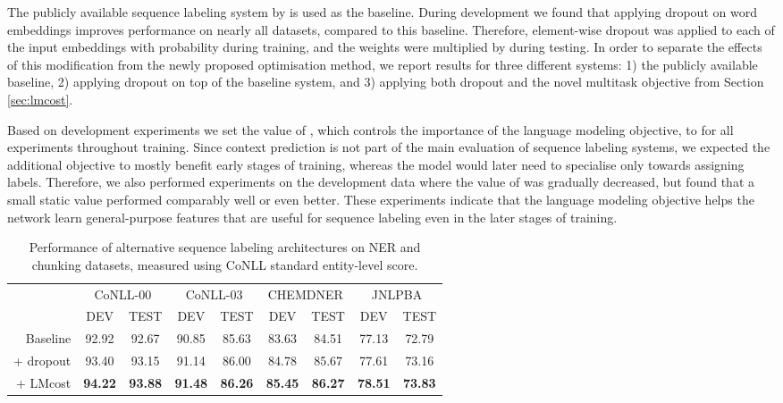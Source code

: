 \documentclass[11pt,a4paper]{article}
\begin{document}
The publicly available sequence labeling system by  is used as the baseline.
During development we found that applying dropout \cite{Srivastava2014a} on word embeddings improves performance on nearly all datasets, compared to this baseline. Therefore, element-wise dropout was applied to each of the input embeddings with probability  during training, and the weights were multiplied by  during testing. In order to separate the effects of this modification from the newly proposed optimisation method, we report results for three different systems: 1) the publicly available baseline, 2) applying dropout on top of the baseline system, and 3) applying both dropout and the novel multitask objective from Section \ref{sec:lmcost}.

Based on development experiments we set the value of , which controls the importance of the language modeling objective, to  for all experiments throughout training.
Since context prediction is not part of the main evaluation of sequence labeling systems, we expected the additional objective to mostly benefit early stages of training, whereas the model would later need to specialise only towards assigning labels. Therefore, we also performed experiments on the development data where the value of  was gradually decreased, but found that a small static value performed comparably well or even better. These experiments indicate that the language modeling objective helps the network learn general-purpose features that are useful for sequence labeling even in the later stages of training.





\begin{table*}[t]
\setlength\tabcolsep{11.7pt}
\begin{tabular}{r|cc|cc|cc|cc} \toprule
 & \multicolumn{2}{c|}{CoNLL-00} & \multicolumn{2}{c|}{CoNLL-03} & \multicolumn{2}{c|}{CHEMDNER} & \multicolumn{2}{c}{JNLPBA} \\ 
 & {\small DEV} & {\small TEST} & {\small DEV} & {\small TEST} & {\small DEV} & {\small TEST} & {\small DEV} & {\small TEST} \\\midrule
Baseline & 92.92 & 92.67 & 90.85 & 85.63 & 83.63 & 84.51 & 77.13 & 72.79 \\
+ dropout & 93.40 & 93.15 & 91.14 & 86.00 & 84.78 & 85.67 & 77.61 & 73.16 \\
+ LMcost & \textbf{94.22} & \textbf{93.88} & \textbf{91.48} & \textbf{86.26} & \textbf{85.45} & \textbf{86.27} & \textbf{78.51} & \textbf{73.83} \\ \bottomrule
\end{tabular}
\caption{Performance of alternative sequence labeling architectures on NER and chunking datasets, measured using CoNLL standard entity-level  score.}
\label{tab:results2}
\end{table*}
\end{document}
